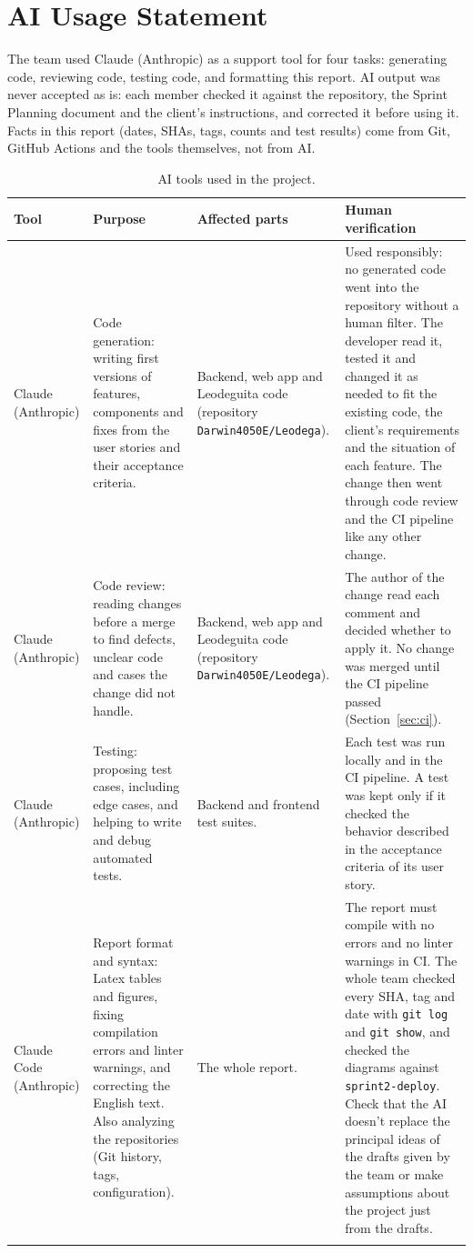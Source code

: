 \section{AI Usage Statement}
\label{sec:ai}

The team used Claude (Anthropic) as a support tool for four tasks: generating code, reviewing code, testing code, and formatting this report.
AI output was never accepted as is: each member checked it against the repository, the Sprint Planning document and the client's instructions, and corrected it before using it.
Facts in this report (dates, SHAs, tags, counts and test results) come from Git, GitHub Actions and the tools themselves, not from AI\@.

\begin{longtable}{@{}L{2.4cm}L{4.0cm}L{3.5cm}L{4.8cm}@{}}
  \toprule
  Tool & Purpose & Affected parts & Human verification \\
  \midrule
  \endhead
  Claude (Anthropic) & Code generation: writing first versions of features, components and fixes from the user stories and their acceptance criteria. & Backend, web app and Leodeguita code (repository \texttt{Darwin4050E/}\allowbreak\texttt{Leodega}). & Used responsibly: no generated code went into the repository without a human filter. The developer read it, tested it and changed it as needed to fit the existing code, the client's requirements and the situation of each feature. The change then went through code review and the CI pipeline like any other change. \\
  Claude (Anthropic) & Code review: reading changes before a merge to find defects, unclear code and cases the change did not handle. & Backend, web app and Leodeguita code (repository \texttt{Darwin4050E/}\allowbreak\texttt{Leodega}). & The author of the change read each comment and decided whether to apply it. No change was merged until the CI pipeline passed (Section~\ref{sec:ci}). \\
  Claude (Anthropic) & Testing: proposing test cases, including edge cases, and helping to write and debug automated tests. & Backend and frontend test suites. & Each test was run locally and in the CI pipeline. A test was kept only if it checked the behavior described in the acceptance criteria of its user story. \\
  Claude Code (Anthropic) & Report format and syntax: Latex tables and figures, fixing compilation errors and linter warnings, and correcting the English text. Also analyzing the repositories (Git history, tags, configuration). & The whole report. & The report must compile with no errors and no linter warnings in CI\@. The whole team checked every SHA, tag and date with \texttt{git log} and \texttt{git show}, and checked the diagrams against \texttt{sprint2-deploy}. Check that the AI doesn't replace the principal ideas of the drafts given by the team or make assumptions about the project just from the drafts. \\
  \bottomrule
  \caption{AI tools used in the project.}
  \label{tab:ai-usage}
\end{longtable}
